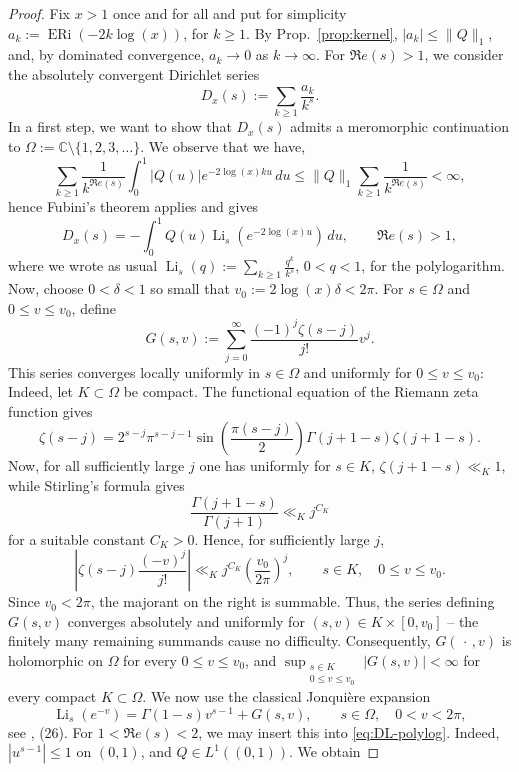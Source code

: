 \documentclass[a4paper,10pt]{amsart}
\DeclareMathOperator{\ERi}{ERi}
\theoremstyle{definition}
\numberwithin{equation}{section}
\begin{document}
\begin{proof}
Fix $x>1$ once and for all and put for simplicity $a_k:=\ERi(-2k\log(x))$, for $k\geq 1$. By Prop.\ \ref{prop:kernel}, $|a_k|\leq \|Q\|_1$, and, by dominated convergence, $a_k\to0$ as $k\to\infty$. For $\Re e(s)>1$, we consider the absolutely convergent Dirichlet series
$$
D_x(s):=\sum_{k\geq1}\frac{a_k}{k^s}.
$$
In a first step, we want to show that $D_x(s)$  admits a meromorphic continuation to $\Omega:=\mathbb C\setminus\{1,2,3,\ldots\}$. We observe that we have,
$$
\sum_{k\geq1}\frac1{k^{\Re e(s)}} \int_0^1|Q(u)|e^{-2\log(x)ku}\,du \leq \|Q\|_1\sum_{k\geq1}\frac1{k^{\Re e(s)}} <\infty,
$$
hence Fubini's theorem applies and gives
\begin{equation}\label{eq:DL-polylog}
D_x(s) = -\int_0^1Q(u)\operatorname{Li}_s(e^{-2\log(x)u})\,du,
\qquad \Re e(s)>1,
\end{equation}
where we wrote as usual $\operatorname{Li}_s(q):=\sum_{k\geq1}\frac{q^k}{k^s}$, $0<q<1$, for the polylogarithm. Now, choose $0<\delta<1$ so small that $v_0:=2\log(x)\delta<2\pi$. For $s\in\Omega$ and $0\leq v\leq v_0$, define
$$
G(s,v):= \sum_{j=0}^\infty \frac{(-1)^j\zeta(s-j)}{j!}v^j.
$$
This series converges locally uniformly in $s\in\Omega$ and uniformly for $0\leq v\leq v_0$: Indeed, let $K\subset\Omega$ be compact. The functional equation of the Riemann zeta function gives
$$
\zeta(s-j) = 2^{s-j}\pi^{s-j-1} \sin\left(\frac{\pi(s-j)}2\right) \Gamma(j+1-s)\zeta(j+1-s).
$$
Now, for all sufficiently large $j$ one has uniformly for $s\in K$, $\zeta(j+1-s)\ll_K1$, while Stirling's formula gives
$$
\frac{\Gamma(j+1-s)}{\Gamma(j+1)}
\ll_K j^{C_K}
$$
for a suitable constant $C_K>0$. Hence, for sufficiently large $j$, 
$$
\left| \zeta(s-j)\frac{(-v)^j}{j!} \right| \ll_K j^{C_K}\left(\frac{v_0}{2\pi}\right)^j, \qquad s\in K,\quad 0\leq v\leq v_0.
$$
Since $v_0<2\pi$, the majorant on the right is summable. Thus, %
the series defining $G(s,v)$ converges absolutely and uniformly for $(s,v)\in K\times[0,v_0]$ -- the finitely many remaining summands cause no difficulty. Consequently, $G(\,\cdot\,,v)$ is holomorphic on $\Omega$ for every $0\leq v\leq v_0$, and $\sup_{\substack{s\in K\\0\leq v\leq v_0}}|G(s,v)|<\infty$ for every compact $K\subset\Omega$. We now use the classical Jonqui\`ere expansion
$$
\operatorname{Li}_s(e^{-v}) = \Gamma(1-s)v^{s-1}+G(s,v), \qquad s\in\Omega,\quad 0<v<2\pi,
$$
see \cite{FornbergKolbig}, (26). For $1<\Re e(s)<2$, we may insert this into \eqref{eq:DL-polylog}. Indeed, $|u^{s-1}|\leq1$ on $(0,1)$, and $Q\in L^1((0,1))$. We obtain

\end{proof}
\end{document}
